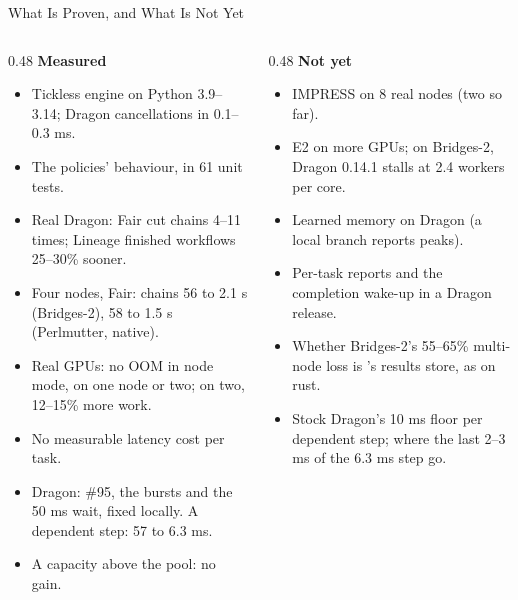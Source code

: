 \documentclass[aspectratio=169, 10pt, t]{beamer}
\begin{document}
\begin{frame}{What Is Proven, and What Is Not Yet}
\bodysmall
\begin{columns}[T]
\begin{column}{0.48\textwidth}
\textbf{Measured}
\begin{itemize}
  \item Tickless engine on Python 3.9--3.14; Dragon cancellations in 0.1--0.3 ms.
  \item The policies' behaviour, in 61 unit tests.
  \item Real Dragon: Fair cut chains 4--11 times; Lineage finished workflows 25--30\% sooner.
  \item Four nodes, Fair: chains 56 to 2.1 s (Bridges-2), 58 to 1.5 s (Perlmutter, native).
  \item Real GPUs: no OOM in node mode, on one node or two; on two, 12--15\% more work.
  \item No measurable latency cost per task.
  \item Dragon: \#95, the bursts and the 50 ms wait, fixed locally. A dependent step: 57 to 6.3 ms.
  \item A capacity above the pool: no gain.
\end{itemize}
\end{column}
\begin{column}{0.48\textwidth}
\textbf{Not yet}
\begin{itemize}
  \item IMPRESS on 8 real nodes (two so far).
  \item E2 on more GPUs; on Bridges-2, Dragon 0.14.1 stalls at 2.4 workers per core.
  \item Learned memory on Dragon (a local branch reports peaks).
  \item Per-task reports and the completion wake-up in a Dragon release.
  \item Whether Bridges-2's 55--65\% multi-node loss is 's results store, as on rust.
  \item Stock Dragon's 10 ms floor per dependent step; where the last 2--3 ms of the 6.3 ms step go.
\end{itemize}
\end{column}
\end{columns}
\end{frame}
\end{document}
